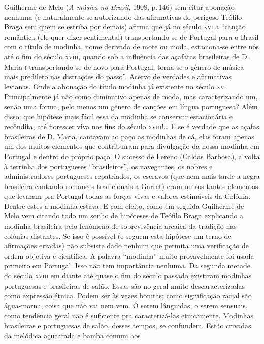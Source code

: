 Guilherme de Melo (\textit{A música no Brasil}, 1908, p.\,146) sem citar abonação
nenhuma (e naturalmente se autorizando das afirmativas do perigoso
Teófilo Braga sem quem se estriba por demais) afirma que já no século \textsc{xvi}
a ``canção romântica (ele quer dizer sentimental) transportando-se de
Portugal para o Brasil com o título de modinha, nome derivado de mote ou
moda, estaciona-se entre nós até o fim do século \textsc{xviii}, quando sob a
influência das açafatas brasileiras de D. Maria \textsc{i} transportando-se de
novo para Portugal, torna-se o gênero de música mais predileto nas
distrações do passo''. Acervo de verdades e afirmativas levianas. Onde a
abonação do título modinha já existente no século \textsc{xvi}. Principalmente já
não como diminutivo apenas de moda, mas caracterizando um, senão uma
forma, pelo menos um gênero de canções em língua portuguesa? Além disso:
que hipótese mais fácil essa da modinha se conservar estacionária e
recôndita, até florescer viva nos fins do século \textsc{xviii}!\ldots{} E se é verdade
que as açafas brasileiras de D. Maria, cantavam ao paço as modinhas de
cá, elas foram apenas um dos muitos elementos que contribuíram para
divulgação da nossa modinha em Portugal e dentro do próprio paço. O
sucesso de Lereno (Caldas Barbosa), a volta à terrinha dos portugueses
``brasileiros'', os navegantes, os nobres e administradores portugueses
repatriados, os escravos (que nem mais tarde a negra brasileira cantando
romances tradicionais a Garret) eram outros tantos elementos que levaram
pra Portugal todas as forças vivas e valores estimáveis da Colônia.
Dentre estes a modinha estava. E com efeito, como em seguida Guilherme
de Melo vem citando todo um sonho de hipóteses de Teófilo Braga
explicando a modinha brasileira pelo fenômeno de sobrevivência arcaica
da tradição nas colônias distantes. Se isso é possível (e seguem esta
hipótese um terno de afirmações erradas) não subsiste dado nenhum que
permita uma verificação de ordem objetiva e científica. A palavra
``modinha'' muito provavelmente foi usada primeiro em Portugal. Isso não
tem importância nenhuma. Da segunda metade do século \textsc{xviii} em diante até
quase o fim do século passado existiram modinhas portuguesas e
brasileiras de salão. Essas são no geral muito descaracterizadas como
expressão étnica. Podem ser às vezes bonitas; como significação racial
são água-morna, coisa que não vai nem vem. O serem lânguidas, o serem
sensuais, como tendência geral não é suficiente pra caracterizá-las
etnicamente. Modinhas brasileiras e portuguesas de salão, desses tempos,
se confundem. Estão crivadas da melódica açucarada e bamba comum aos
